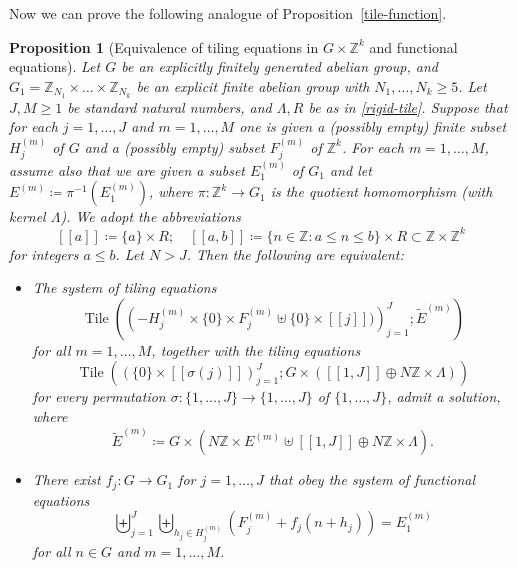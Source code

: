 \documentclass[reqno,a4paper,12pt]{amsart}
\numberwithin{equation}{section}
\numberwithin{figure}{section}
\def\Z{\mathbb{Z}}
\renewcommand\leq{\leqslant}
\renewcommand\geq{\geqslant}
\newcommand{\Tile}{\operatorname{Tile}}
\theoremstyle{plain}
\newtheorem{proposition}[thm]{Proposition}
\theoremstyle{definition}
\newcommand{\propref}[1]{Proposition~\ref{#1}}
\begin{document}
Now we can prove the following analogue  of \propref{tile-function}.

\begin{proposition}[Equivalence of tiling equations in $G\times\Z^k$ and functional equations]\label{tile-function'} 
Let $G$ be an explicitly finitely generated abelian group, and $G_1=\Z_{N_1}\times\dots\times \Z_{N_k}$ be an explicit finite abelian group with $N_1,\dots,N_k \geq 5$. Let $J,M \geq 1$ be standard natural numbers, and $\Lambda, R$ be as in \ref{rigid-tile}.
Suppose that for each $j=1,\dots,J$ and $m=1,\dots,M$ one is given a (possibly empty) finite subset $H_j^{(m)}$ of $G$ and a (possibly empty) subset $F_j^{(m)}$ of $\Z^k$.  For each $m=1,\dots,M$, assume also that we are given a subset $E_1^{(m)}$ of $G_1$ and let $E^{(m)} \coloneqq \pi^{-1}(E_1^{(m)})$, where $\pi \colon \Z^k \to G_1$ is the quotient homomorphism (with kernel $\Lambda$).
 We adopt the abbreviations
$$ [[a]] \coloneqq \{a\} \times R ; \quad [[a,b]] \coloneqq  \{ n \in \Z: a\leq n \leq b\} \times R \subset \Z\times \Z^k $$
for integers $a \leq b$.  Let $N>J$. Then the following are equivalent:
\begin{itemize}
\item[(i)]  The system of tiling equations
\begin{equation}\label{tile-1'}
\Tile\left( \left( -H_j^{(m)} \times \{0\} \times F_j^{(m)} \uplus \{0\} \times [[j]])\right)_{j=1}^J; \tilde E^{(m)} \right)
\end{equation}
for all $m=1,\dots,M$, together with the tiling equations
\begin{equation}\label{tile-2'}
\Tile\left( \left( \{0\} \times [[\sigma(j)]] \right)_{j=1}^J; G \times ([[1,J]]\oplus N\Z\times\Lambda ) \right)
\end{equation}
for every permutation $\sigma \colon \{1,\dots,J\} \to \{1,\dots,J\}$ of $\{1,\dots,J\}$, admit a solution, where
$$ \tilde E^{(m)} \coloneqq G \times (N\Z \times E^{(m)} \uplus [[1,J]] \oplus N\Z\times \Lambda ).$$
\item[(ii)]  There exist $f_j \colon G \to G_1$ for $j=1,\dots,J$ that obey the system of functional equations
\begin{equation}\label{func-eq-stack'}
\biguplus_{j=1}^J \biguplus_{h_j \in H_j^{(m)}} (F_j^{(m)} + f_j(n+h_j)) = E_1^{(m)} 
\end{equation}
for all $n \in G$ and $m=1,\dots,M$.
\end{itemize}
\end{proposition}
\end{document}

